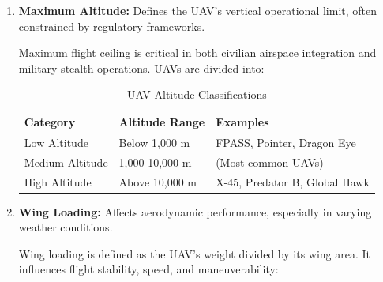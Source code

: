 \begin{enumerate}
    \item \textbf{Maximum Altitude:} Defines the UAV’s vertical operational limit, often constrained by regulatory frameworks.

    Maximum flight ceiling is critical in both civilian airspace integration and military stealth operations. UAVs are divided into:


    \begin{table}[h]
        \centering
        \label{tab:uav_altitude}
        \begin{tabular}{|l|l|l|}
        \hline
        \textbf{Category} & \textbf{Altitude Range} & \textbf{Examples} \\ \hline
        Low Altitude & Below 1,000 m & FPASS, Pointer, Dragon Eye \\ \hline
        Medium Altitude & 1,000-10,000 m & (Most common UAVs) \\ \hline
        High Altitude & Above 10,000 m & X-45, Predator B, Global Hawk \\ \hline
        \end{tabular}
        \caption{UAV Altitude Classifications}
    \end{table}




    \item \textbf{Wing Loading:} Affects aerodynamic performance, especially in varying weather conditions.

    Wing loading is defined as the UAV's weight divided by its wing area. It influences flight stability, speed, and maneuverability:


\end{enumerate}
